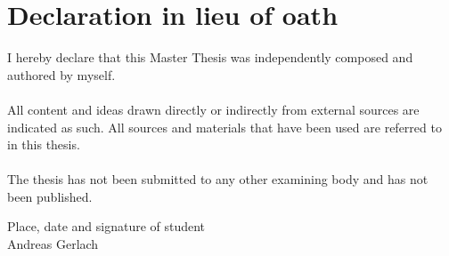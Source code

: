 
\chapter*{Declaration in lieu of oath}

I hereby declare that this Master Thesis was independently composed and authored by myself. \\ \\


All content and ideas drawn directly or indirectly from external sources are indicated as such. All sources and materials that have been used are referred to in this thesis. \\ \\


The thesis has not been submitted to any other examining body and has not been published.

\vspace{2cm}
Place, date and signature of student \\
\vspace{3cm}
Andreas Gerlach



